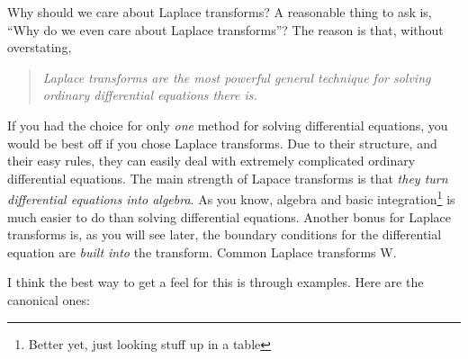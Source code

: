 \documentclass[11pt]{article}
\theoremstyle{mystyle}
\begin{document}
\begin{psmotivation}{Why should we care about Laplace transforms?}{}
    A reasonable thing to ask is, ``Why do we even care about
    Laplace transforms''? The reason is that, without overstating,
    \begin{quote}
        \emph{Laplace transforms are the most powerful general technique
        for solving ordinary differential equations there is.}
    \end{quote}
    If you had the choice for only \emph{one} method for solving
    differential equations, you would be best off if you chose
    Laplace transforms. Due to their structure, and their
    easy rules, they can easily deal with extremely complicated
    ordinary differential equations.
    The main strength of Lapace transforms is
    that \emph{they turn differential equations
    into algebra}. As you know, algebra and basic
    integration\footnote{Better yet, just looking
    stuff up in a table} is much easier to do than solving
    differential equations. Another bonus for Laplace
    transforms is, as you will see later, the boundary
    conditions for the differential equation are \emph{built
    into} the transform. Common Laplace transforms W.
\end{psmotivation}

\noin
\color{black} I think the best way to get a feel for this
is through examples. Here are the canonical ones:
\end{document}
